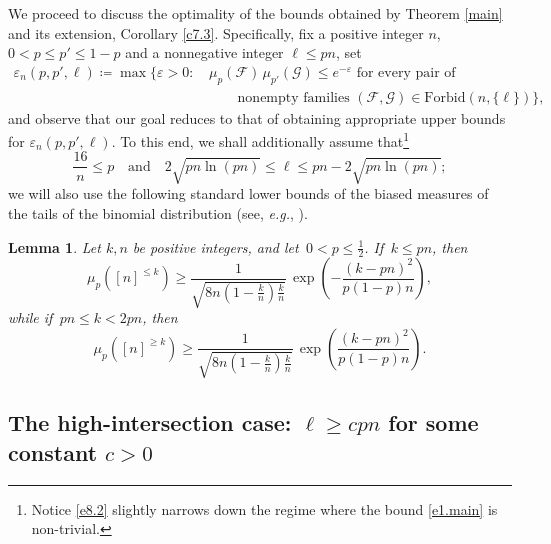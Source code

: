 \documentclass[10pt]{amsart}
\newtheorem{lem}[thm]{Lemma}
\theoremstyle{remark}
\newcommand{\ee}{\varepsilon}
\newcommand{\meg}{\geqslant}
\newcommand{\mik}{\leqslant}
\newcommand{\Fcal}{\mathcal{F}}
\newcommand{\Gcal}{\mathcal{G}}
\begin{document}
We proceed to discuss the optimality of the bounds obtained by Theorem \ref{main} and its extension, Corollary \ref{c7.3}.
Specifically, fix a positive integer $n$, $0<p\mik p'\mik 1-p$ and a nonnegative integer $\ell\mik pn$, set
\begin{align} \label{e8.1}
\ee_n(p,p',\ell)\coloneqq \max\!\big\{\ee>0: &
\, \mu_p(\Fcal)\,\mu_{p'}(\Gcal)\mik e^{-\ee} \text{ for every pair of} \\
& \ \ \ \ \ \ \ \ \ \
\text{nonempty families } (\Fcal,\Gcal)\in\mathrm{Forbid}(n,\{\ell\}) \big\}, \nonumber
\end{align}
and observe that our goal reduces to that of obtaining appropriate upper bounds for $\ee_n(p,p',\ell)$.
To this end, we shall additionally assume that\footnote{Notice \eqref{e8.2} slightly narrows down the regime
where the bound \eqref{e1.main} is non-trivial.}
\begin{equation} \label{e8.2}
\frac{16}{n}\mik p \ \ \ \text{ and } \ \ \ 2\sqrt{pn\ln(pn)}\mik \ell\mik pn-2\sqrt{pn\ln(pn)};
\end{equation}
we will also use the following standard lower bounds of the biased measures of the
tails of the binomial distribution (see, \textit{e.g.}, \cite[p. 115]{Ash65}).
\begin{lem} \label{l8.1}
Let $k, n$ be positive integers, and let\, $0<p\mik \frac12$. If\, $k\mik pn$, then
\begin{equation} \label{e8.3}
\mu_p\left([n]^{\mik k}\right) \meg \frac{1}{\sqrt{8n\left(1-\frac{k}{n}\right)\!\frac{k}{n}}}\,
\exp\left(-\frac{(k-pn)^2}{p(1-p)n}\right),
\end{equation}
while if\, $pn\mik k< 2pn$, then
\begin{equation} \label{e8.4}
\mu_p\left([n]^{\meg k}\right) \meg \frac{1}{\sqrt{8n\left(1-\frac{k}{n}\right)\!\frac{k}{n}}}\,
\exp\left(\frac{(k-pn)^2}{p(1-p)n}\right).
\end{equation}
\end{lem}

\subsection{The high-intersection case: $\ell\meg cpn$ for some constant $c>0$} \label{subsec8.1}
\end{document}
